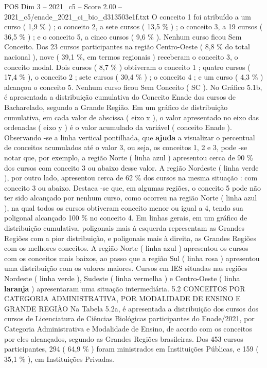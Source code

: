 \begin{textsample}{POS Dim 3 – 2021\_c5 – Score 2.00 – 2021\_c5/enade\_2021\_ci\_bio\_d313503e1f.txt}
O conceito 1 foi atribuído a um curso ( 1,9 \% ) ; o conceito 2, a sete cursos ( 13,5 \% ) ; o conceito 3, a 19 cursos ( 36,5 \% ) ; e o conceito 5, a cinco cursos ( 9,6 \% ).
Nenhum curso ficou Sem Conceito.
Dos 23 cursos participantes na região Centro-Oeste ( 8,8 \% do total nacional ), nove ( 39,1 \%, em termos regionais ) receberam o conceito 3, o conceito modal.
Dois cursos ( 8,7 \% ) obtiveram o conceito 1 ; quatro cursos ( 17,4 \% ), o conceito 2 ; sete cursos ( 30,4 \% ) ; o conceito 4 ; e um curso ( 4,3 \% ) alcançou o conceito 5.
Nenhum curso ficou Sem Conceito ( SC ).
No Gráfico 5.1b, é apresentada a distribuição cumulativa do Conceito Enade dos cursos de Bacharelado, segundo a Grande Região.
Em um gráfico de distribuição cumulativa, em cada valor de abscissa ( eixo x ), o valor apresentado no eixo das ordenadas ( eixo y ) é o valor acumulado da variável ( conceito Enade ).
Observando -se a linha vertical pontilhada, que \textbf{ajuda} a visualizar o percentual de conceitos acumulados até o valor 3, ou seja, os conceitos 1, 2 e 3, pode -se notar que, por exemplo, a região Norte ( linha azul ) apresentou cerca de 90 \% dos cursos com conceito 3 ou abaixo desse valor.
A região Nordeste ( linha verde ), por outro lado, apresentou cerca de 62 \% dos cursos na mesma situação : com conceito 3 ou abaixo.
Destaca -se que, em algumas regiões, o conceito 5 pode não ter sido alcançado por nenhum curso, como ocorreu na região Norte ( linha azul ), na qual todos os cursos obtiveram conceito menor ou igual a 4, tendo sua poligonal alcançado 100 \% no conceito 4.
Em linhas gerais, em um gráfico de distribuição cumulativa, poligonais mais à esquerda representam as Grandes Regiões com a pior distribuição, e poligonais mais à direita, as Grandes Regiões com os melhores conceitos.
A região Norte ( linha azul ) apresentou os cursos com os conceitos mais baixos, ao passo que a região Sul ( linha rosa ) apresentou uma distribuição com os valores maiores.
Cursos em IES situadas nas regiões Nordeste ( linha verde ), Sudeste ( linha vermelha ) e Centro-Oeste ( linha \textbf{laranja} ) apresentaram uma situação intermediária. 5.2 CONCEITOS POR CATEGORIA ADMINISTRATIVA, POR MODALIDADE DE ENSINO E GRANDE REGIÃO Na Tabela 5.2a, é apresentada a distribuição dos cursos dos cursos de Licenciatura de Ciências Biológicas participantes do Enade/2021, por Categoria Administrativa e Modalidade de Ensino, de acordo com os conceitos por eles alcançados, segundo as Grandes Regiões brasileiras.
Dos 453 cursos participantes, 294 ( 64,9 \% ) foram ministrados em Instituições Públicas, e 159 ( 35,1 \% ), em Instituições Privadas.

\end{textsample}
